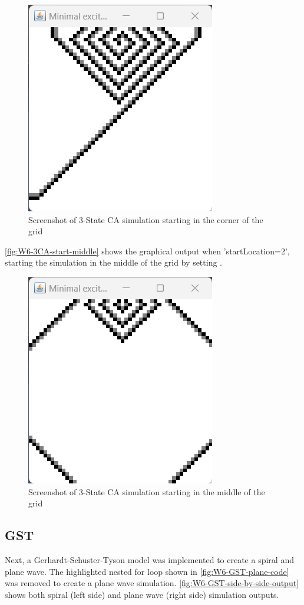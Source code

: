 \begin{figure}[H] 
    \centering
    \includegraphics[width=0.49\columnwidth]{Figures/Week 6/3stateCA-CORNER-output.png}
    \caption{Screenshot of 3-State CA simulation starting in the corner of the grid}
    \label{fig:W6-3CA-start-corner}
\end{figure}

\autoref{fig:W6-3CA-start-middle} shows the graphical output when 'startLocation=2', starting the simulation in the middle of the grid by setting . 
\begin{figure}[H] 
    \centering
    \includegraphics[width=0.49\columnwidth]{Figures/Week 6/3stateCA-MIDDLE-output.png}
    \caption{Screenshot of 3-State CA simulation starting in the middle of the grid}
    \label{fig:W6-3CA-start-middle}
\end{figure}

\subsection{GST}
Next, a Gerhardt-Schuster-Tyson model was implemented to create a spiral and plane wave. The highlighted nested for loop shown in \autoref{fig:W6-GST-plane-code} was removed to create a plane wave simulation. \autoref{fig:W6-GST-side-by-side-output} shows both spiral (left side) and plane wave (right side) simulation outputs.

